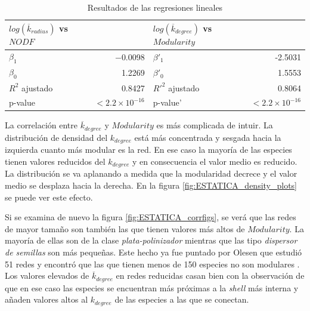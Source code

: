 \begin{table}[ht]
\centering
\begin{tabular}{|l r | l r|}
\hline
$log(\overline {k}_{radius})$ vs $NODF$& & $log(\overline {k}_{degree})$ vs $Modularity$ & \\
\hline
$\beta_1$ & $-$0.0098 & $\beta'_1$ & -2.5031 \\
$\beta_0$ & 1.2269 & $\beta'_0$ & 1.5553 \\
$R^2$ ajustado&  0.8427  & $R'^2$ ajustado& 0.8064\\
p-value & $<2.2 \times 10^{-16}$& p-value' & $<2.2 \times 10^{-16}$\\
\hline
\end{tabular}
\caption{\label{table:table_lmodel} Resultados de las regresiones lineales}
\end{table}

La correlación entre $\overline {k}_{degree}$ y $Modularity$ es más complicada de intuir. La distribución de densidad del $k_{degree}$ está más concentrada y sesgada hacia la izquierda cuanto más modular es la red. En ese caso la mayoría de las especies tienen valores reducidos del ${k}_{degree}$ y en consecuencia el valor medio es reducido. La distribución se va aplanando a medida que la modularidad decrece y el valor medio se desplaza hacia la derecha. En la figura \ref{fig:ESTATICA_density_plots} se puede ver este efecto.

Si se examina de nuevo la figura \ref{fig:ESTATICA_corrfigs}, se verá que las redes de mayor tamaño son también las que tienen valores más altos de $Modularity$. La mayoría de ellas son de la clase \textit{plata-polinizador} mientras que las tipo \textit{dispersor de semillas} son más pequeñas. Este hecho ya fue puntado por Olesen que estudió 51 redes y encontró que las que tienen menos de 150 especies no son modulares \cite{olesen2007modularity}. Los valores elevados de $\overline {k}_{degree}$ en redes reducidas casan bien con la observación de que en ese caso las especies se encuentran más próximas a la \textit{shell} más interna y añaden valores altos al ${k}_{degree}$ de las especies a las que se conectan.

